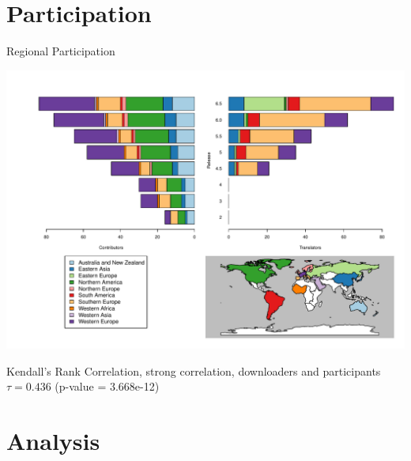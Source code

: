 \documentclass{beamer}
\begin{document}
\section{Participation}
\begin{frame}{Regional Participation}
\vspace{-.3in}
	\begin{center}
		\includegraphics[width=1\textwidth]{RegionalParticipation.pdf}
		
	
	Kendall's Rank Correlation, strong correlation, downloaders and participants $\tau = 0.436$ (p-value = 3.668e-12)	
	\end{center}
	
\end{frame}

\section{Analysis}
\end{document}

